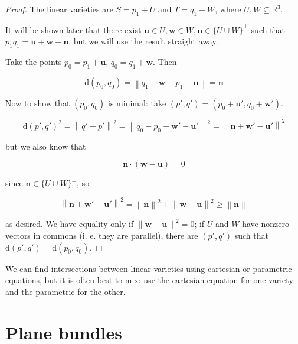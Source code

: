 \documentclass[12pt,a4paper]{report}
\newcommand{\norm}[1]{\left\lVert#1\right\rVert}
\numberwithin{equation}{section}
\theoremstyle{definition}
\theoremstyle{remark}
\begin{document}
\begin{proof}
The linear varieties are $S = p_1 + U$ and  $T= q_1 + W$, where $U, W \subseteq \mathbb{R}^3$.

It will be shown later that there exist $\mathbf{u} \in U, \mathbf{w} \in W, \mathbf{n} \in \lbrace U \cup W \rbrace ^\perp$ such that $p_1 q_1 = \mathbf{u} + \mathbf{w} + \mathbf{n}$, but we will use the result straight away.

Take the points $p_0 = p_1 + \mathbf{u}$, $q_0 = q_1 + \mathbf{w}$. Then

\begin{equation}
\text{d}(p_0, q_0) = \norm{q_1 - \mathbf{w} - p_1 - \mathbf{u}} = \mathbf{n}
\end{equation}

Now to show that $(p_0, q_0)$ is minimal: take $(p', q') = (p_0 + \mathbf{u}', q_0 + \mathbf{w}')$.

\begin{equation}
\text{d}(p', q')^2 = \norm{q'-p'}^2 = \norm{q_0 - p_0 + \mathbf{w}' - \mathbf{u}'}^2 = \norm{\mathbf{n} + \mathbf{w}' - \mathbf{u}'}^2 
\end{equation}

but we also know that

\begin{equation}
\mathbf{n} \cdot (\mathbf{w} - \mathbf{u}) = 0
\end{equation}

since $\mathbf{n} \in \lbrace U \cup W \rbrace ^\perp$, so

\begin{equation}
\norm{\mathbf{n} + \mathbf{w}' - \mathbf{u}'}^2 = \norm{\mathbf{n}}^2 + \norm{\mathbf{w} -\mathbf{u}}^2 \geq \norm{\mathbf{n}}
\end{equation}

as desired. We have equality only if $\norm{\mathbf{w} -\mathbf{u}}^2=0$; if $U$ and $W$ have nonzero vectors in commons (i. e. they are parallel), there are $(p', q')$ such that $\text{d}(p', q')=\text{d}(p_0, q_0)$. 
\end{proof}

We can find intersections between linear varieties using cartesian or parametric equations, but it is often best to mix: use the cartesian equation for one variety and the parametric for the other.

\section{Plane bundles}
\end{document}
